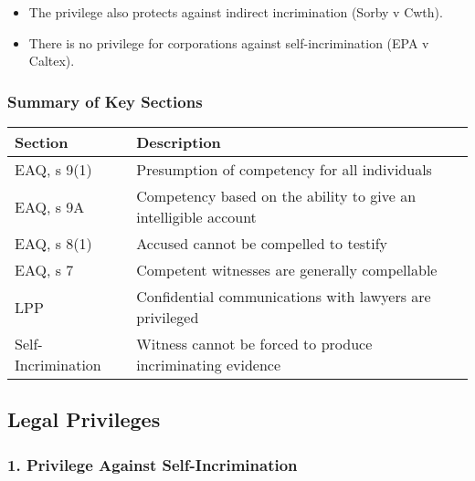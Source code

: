 \begin{itemize}
\tightlist
\item
  The privilege also protects against indirect incrimination (Sorby v
  Cwth).
\item
  There is no privilege for corporations against self-incrimination (EPA
  v Caltex).
\end{itemize}

\subsubsection{Summary of Key Sections}\label{summary-of-key-sections}

\begin{longtable}[]{@{}
  >{\raggedright\arraybackslash}p{}
  >{\raggedright\arraybackslash}p{}@{}}
\toprule\noalign{}
\begin{minipage}[b]{\linewidth}\raggedright
Section
\end{minipage} & \begin{minipage}[b]{\linewidth}\raggedright
Description
\end{minipage} \\
\midrule\noalign{}
\endhead
\bottomrule\noalign{}
\endlastfoot
EAQ, s 9(1) & Presumption of competency for all individuals \\
EAQ, s 9A & Competency based on the ability to give an intelligible
account \\
EAQ, s 8(1) & Accused cannot be compelled to testify \\
EAQ, s 7 & Competent witnesses are generally compellable \\
LPP & Confidential communications with lawyers are privileged \\
Self-Incrimination & Witness cannot be forced to produce incriminating
evidence \\
\end{longtable}

\subsection{  Legal Privileges}\label{legal-privileges}

\subsubsection{\texorpdfstring{1. \textbf{Privilege Against
Self-Incrimination}}{1. Privilege Against Self-Incrimination}}\label{privilege-against-self-incrimination}

